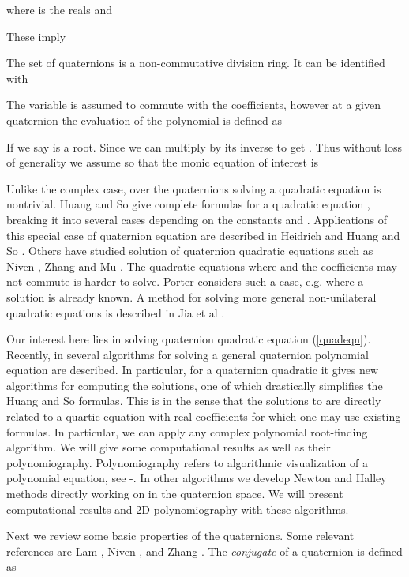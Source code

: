 \documentclass{article}
\theoremstyle{definition}
\begin{document}
where  is the reals and

These imply

The set of quaternions  is a non-commutative division ring. It can
be identified with 


The variable  is assumed to commute with the coefficients, however at a given quaternion  the evaluation of the polynomial is defined as


If  we say  is a root. Since  we can multiply by its inverse to get .
Thus  without loss of generality we assume  so that the monic equation of interest is


Unlike the complex case, over the quaternions solving a quadratic
equation is nontrivial. Huang and So \cite{Huang} give complete
formulas for a quadratic equation , breaking it into
several cases depending on the constants  and . Applications of
this special case of quaternion equation are described in Heidrich
\cite {Heidrich} and Huang and So \cite{Huang2}. Others have studied
solution of quaternion quadratic equations such as Niven
\cite{Niven}, Zhang and Mu \cite{Zhang2}. The quadratic equations
where  and the coefficients may not commute  is harder to
solve. Porter \cite{Porter} considers such a case, e.g.  where a solution is already known. A method for solving
more general non-unilateral quadratic equations is described in Jia
et al \cite{Jia}.

Our interest here lies in solving quaternion quadratic
equation (\ref{quadeqn}). Recently, in \cite{kalQ} several algorithms for solving a general quaternion polynomial
equation are described. In particular, for a quaternion quadratic it  gives new
algorithms for computing the solutions, one of which drastically
simplifies the Huang and So \cite{Huang} formulas. This is in the
sense that the solutions to  are directly related to a
quartic equation with real coefficients for which one may use existing formulas. In particular, we can
apply any complex polynomial root-finding algorithm. We will
give some computational results as well as their polynomiography.
Polynomiography refers to algorithmic visualization of a polynomial equation, see \cite{kalbook}-\cite{kal2005c}. In
other algorithms we develop Newton and Halley methods directly
working on  in the quaternion space. We will present computational
results and 2D polynomiography with these algorithms.

Next we review some basic properties of the quaternions. Some
relevant references are Lam \cite{Lam}, Niven \cite{Niven}, and
Zhang \cite{Zhang}. The {\it conjugate} of a quaternion  is defined as
\end{document}
